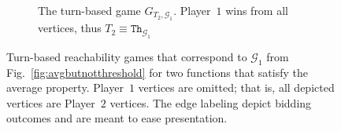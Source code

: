 \documentclass{theoretics}
\newcommand{\PO}{Player~$1$\xspace}
\newcommand{\PT}{Player~$2$\xspace}
\newcommand{\G}{{\mathcal G}}
\newcommand{\thresh}{\texttt{Th}\xspace}
\newcommand{\zug}[1]{\langle #1  \rangle}
\begin{document}
\begin{figure}[ht]
\begin{subfigure}{0.48\textwidth}
			
			
			
			
			
			
			
		\caption{The turn-based game $G_{T_2, \G_1}$. \PO wins from all vertices, thus $T_2 \equiv \thresh_{\G_1}$}\label{fig:turn-based-T2}
	\end{subfigure}
	\caption{Turn-based reachability games that correspond to \(\G_1\) from Fig.~\ref{fig:avgbutnotthreshold} for two functions that satisfy the average property. \PO vertices are omitted; that is, all depicted vertices are \PT vertices. The edge labeling depict bidding outcomes and are meant to ease presentation.}
	\label{fig:turn-based}
\end{figure}
\end{document}
